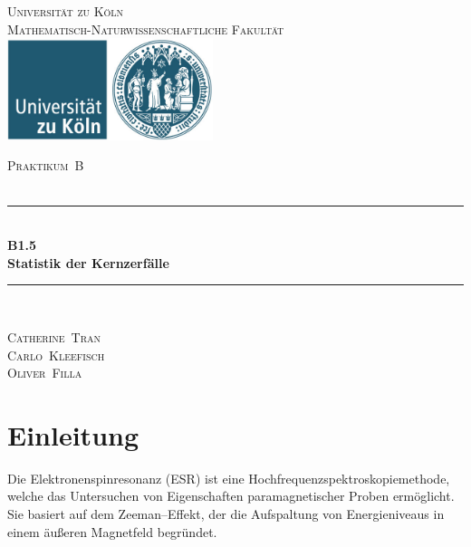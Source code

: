 \documentclass[12pt,a4paper]{scrartcl}
\numberwithin{equation}{section} %
\newcommand{\HRule}{\rule{\linewidth}{0.7mm}}
\begin{document}
\begin{titlepage}
	\pagestyle{empty}

	\begin{center}

	\textsc{\LARGE Universität zu Köln }\\ [0.4cm]
	\textsc{Mathematisch-Naturwissenschaftliche Fakultät} \\[1.5cm]

	\includegraphics[width=0.45\textwidth]{../media/uni.jpg}  %

	\textsc{\Large Praktikum~B}\\[2mm]
	\textsc{}\\[10mm]
	\HRule \\[0.4cm]

		{	\Huge \bfseries B1.5}\\[0.4cm]
			{	\huge \bfseries Statistik der Kernzerfälle}\\[0.3cm]
	
	\HRule \\[3cm]

 	\begin{center}
		\textsc{\Large Catherine~Tran } \\[3pt]
		\textsc{\Large Carlo~Kleefisch } \\[3pt]
		\textsc{\Large Oliver~Filla } \\[3pt]
	\end{center}
	\end{center}
\end{titlepage}

\newpage
\tableofcontents
\newpage

\clearpage
\hypertarget{einleitung}{%
\section{Einleitung}\label{einleitung}}

Die Elektronenspinresonanz (ESR) ist eine
Hochfrequenzspektroskopiemethode, welche das Untersuchen von
Eigenschaften paramagnetischer Proben ermöglicht. Sie basiert auf dem
Zeeman--Effekt, der die Aufspaltung von Energieniveaus in einem äußeren
Magnetfeld begründet.
\end{document}
